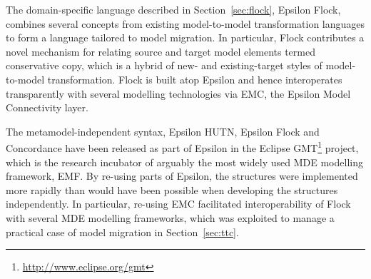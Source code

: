 The domain-specific language described in Section~\ref{sec:flock}, Epsilon Flock, combines several concepts from existing model-to-model transformation languages to form a language tailored to model migration. In particular, Flock contributes a novel mechanism for relating source and target model elements termed conservative copy, which is a hybrid of new- and existing-target styles of model-to-model transformation. Flock is built atop Epsilon and hence interoperates transparently with several modelling technologies via EMC, the Epsilon Model Connectivity layer. 

The metamodel-independent syntax, Epsilon HUTN, Epsilon Flock and Concordance have been released as part of Epsilon in the Eclipse GMT\footnote{\url{http://www.eclipse.org/gmt}} project, which is the research incubator of arguably the most widely used MDE modelling framework, EMF. By re-using parts of Epsilon, the structures were implemented more rapidly than would have been possible when developing the structures independently. In particular, re-using EMC facilitated interoperability of Flock with several MDE modelling frameworks, which was exploited to manage a practical case of model migration in Section~\ref{sec:ttc}.